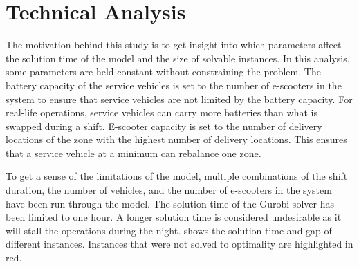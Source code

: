 \section{Technical Analysis} \label{tech_analysis}

The motivation behind this study is to get insight into which parameters affect the solution time of the model and the size of solvable instances. In this analysis, some parameters are held constant without constraining the problem. The battery capacity of the service vehicles is set to the number of e-scooters in the system to ensure that service vehicles are not limited by the battery capacity. For real-life operations, service vehicles can carry more batteries than what is swapped during a shift. E-scooter capacity is set to the number of delivery locations of the zone with the highest number of delivery locations. This ensures that a service vehicle at a minimum can rebalance one zone.

To get a sense of the limitations of the model, multiple combinations of the shift duration, the number of vehicles, and the number of e-scooters in the system have been run through the model. The solution time of the Gurobi solver has been limited to one hour.  A longer solution time is considered undesirable as it will stall the operations during the night.  shows the solution time and gap of different instances. Instances that were not solved to optimality are highlighted in red. 

